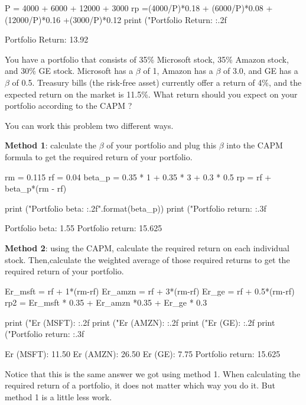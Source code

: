 \cprotEnv \begin{solution}
\begin{ipython}
P = 4000 + 6000 + 12000 + 3000
rp =(4000/P)*0.18 + (6000/P)*0.08 + (12000/P)*0.16 +(3000/P)*0.12
print ("Portfolio Return: {:.2f}%
\end{ipython}
\begin{ioutput}
Portfolio Return: 13.92%
\end{ioutput}
\end{solution}	

\begin{question}
You have a portfolio that consists of 35\% Microsoft stock, 35\% Amazon stock, and 30\% GE stock. Microsoft has a $\beta$ of 1, Amazon has a $\beta$ of 3.0, and GE has a $\beta$ of 0.5. Treasury bills (the risk-free asset) currently offer a return of 4\%, and the expected return on the market is 11.5\%. What return should you expect on your portfolio according to the CAPM ? 
\end{question}

\cprotEnv \begin{solution}
You can work this problem two different ways.

\textbf{Method 1}: calculate the $\beta$ of your portfolio and plug this $\beta$ into the CAPM formula to get the required return of your portfolio.

\begin{ipython}
rm = 0.115
rf = 0.04
beta_p = 0.35 * 1 + 0.35 * 3 + 0.3 * 0.5
rp = rf + beta_p*(rm - rf)

print ("Portfolio beta: {:.2f}".format(beta_p))
print ("Portfolio return: {:.3f}%
\end{ipython}
\begin{ioutput}
Portfolio beta: 1.55
Portfolio return: 15.625%
\end{ioutput}

\textbf{Method 2}: using the CAPM, calculate the required return on each individual stock. Then,calculate the weighted average of those required returns to get the required return of your portfolio.

\begin{ipython}
Er_msft = rf + 1*(rm-rf)
Er_amzn = rf + 3*(rm-rf)
Er_ge = rf + 0.5*(rm-rf)
rp2 = Er_msft * 0.35 + Er_amzn *0.35 + Er_ge * 0.3

print ("Er (MSFT): {:.2f}%
print ("Er (AMZN): {:.2f}%
print ("Er (GE): {:.2f}%
print ("Portfolio return: {:.3f}%
\end{ipython}
\begin{ioutput}
Er (MSFT): 11.50%
Er (AMZN): 26.50%
Er (GE): 7.75%
Portfolio return: 15.625%
\end{ioutput}
Notice that this is the same answer we got using method 1. When calculating the required return of a portfolio, it does not matter which way you do it. But method 1 is a little less work.
\end{solution}
